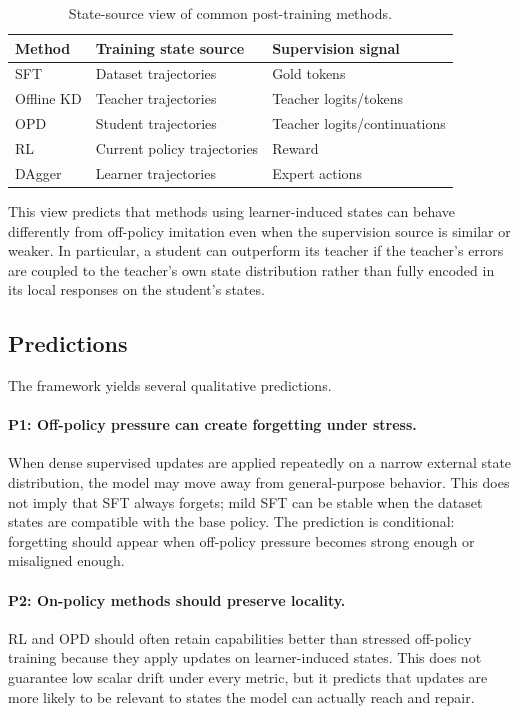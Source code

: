 \documentclass{article}
\begin{document}
\begin{table}[t]
\centering
\caption{State-source view of common post-training methods.}
\label{tab:framework}
\begin{tabular}{lll}
\toprule
Method & Training state source & Supervision signal \\
\midrule
SFT & Dataset trajectories & Gold tokens \\
Offline KD & Teacher trajectories & Teacher logits/tokens \\
OPD & Student trajectories & Teacher logits/continuations \\
RL & Current policy trajectories & Reward \\
DAgger & Learner trajectories & Expert actions \\
\bottomrule
\end{tabular}
\end{table}

This view predicts that methods using learner-induced states can behave
differently from off-policy imitation even when the supervision source is similar
or weaker. In particular, a student can outperform its teacher if the teacher's
errors are coupled to the teacher's own state distribution rather than fully
encoded in its local responses on the student's states.

\subsection{Predictions}

The framework yields several qualitative predictions.

\paragraph{P1: Off-policy pressure can create forgetting under stress.}
When dense supervised updates are applied repeatedly on a narrow external state
distribution, the model may move away from general-purpose behavior. This does
not imply that SFT always forgets; mild SFT can be stable when the dataset
states are compatible with the base policy. The prediction is conditional:
forgetting should appear when off-policy pressure becomes strong enough or
misaligned enough.

\paragraph{P2: On-policy methods should preserve locality.}
RL and OPD should often retain capabilities better than stressed off-policy
training because they apply updates on learner-induced states. This does not
guarantee low scalar drift under every metric, but it predicts that updates are
more likely to be relevant to states the model can actually reach and repair.
\end{document}
